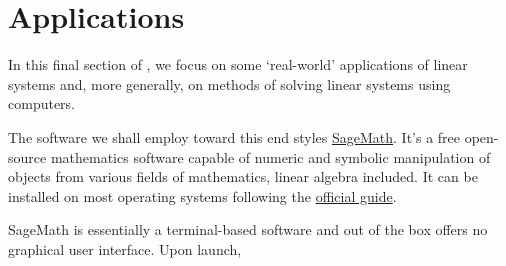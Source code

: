 \section{Applications}
\label{sec:applications}

In this final section of , we focus on some
`real-world' applications of linear systems and, more generally, on methods of
solving linear systems using computers.

The software we shall employ toward this end styles
\href{https://www.sagemath.org/}{SageMath}. It's a free open-source mathematics
software capable of numeric and symbolic manipulation of objects from various
fields of mathematics, linear algebra included. It can be installed on most
operating systems following the
\href{https://doc.sagemath.org/html/en/installation/index.html}{official guide}.

SageMath is essentially a terminal-based software and out of the box offers no
graphical user interface. Upon launch, 
